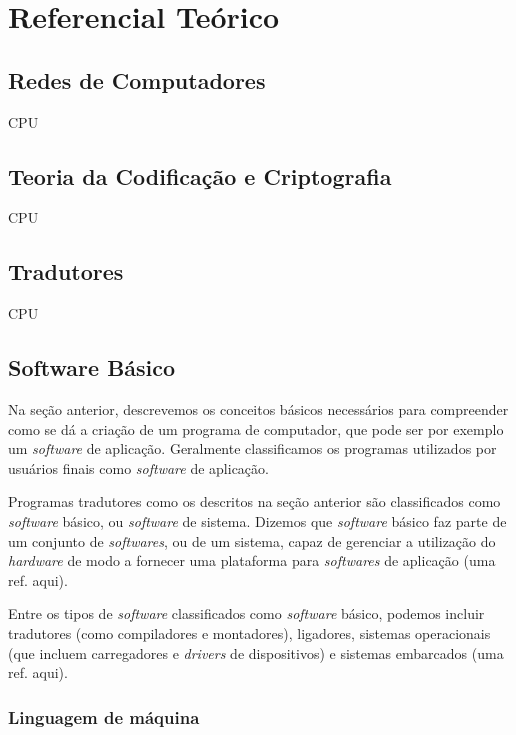 
\chapter{Referencial Teórico}

\section{Redes de Computadores}

CPU

\section{Teoria da Codificação e Criptografia}

CPU

\section{Tradutores}

CPU

\section{Software Básico}

Na seção anterior, descrevemos os conceitos básicos necessários para compreender como se dá a criação de um programa de computador, que pode ser por exemplo um \textit{software} de aplicação. Geralmente classificamos os programas utilizados por usuários finais como \textit{software} de aplicação.

Programas tradutores como os descritos na seção anterior são classificados como \textit{software} básico, ou \textit{software} de sistema. Dizemos que \textit{software} básico faz parte de um conjunto de \textit{softwares}, ou de um sistema, capaz de gerenciar a utilização do \textit{hardware} de modo a fornecer uma plataforma para \textit{softwares} de aplicação (uma ref. aqui).

Entre os tipos de \textit{software} classificados como \textit{software} básico, podemos incluir tradutores (como compiladores e montadores), ligadores, sistemas operacionais (que incluem carregadores e \textit{drivers} de dispositivos) e sistemas embarcados (uma ref. aqui).

\subsection{Linguagem de máquina}


